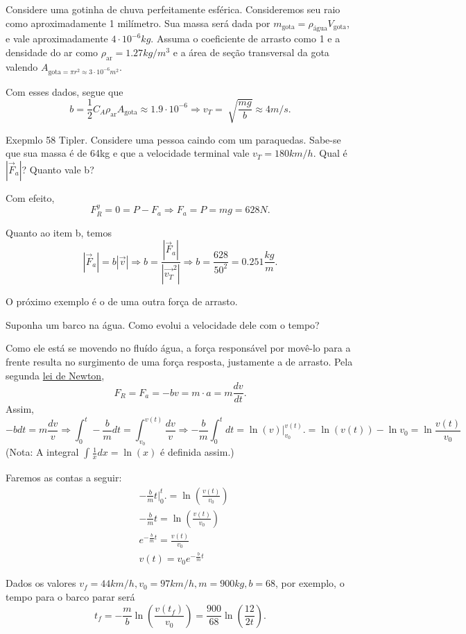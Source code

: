 \documentclass[PhysicsI/physics_notes.tex]{subfiles}
\begin{document}
\begin{example}
	Considere uma gotinha de chuva perfeitamente esférica. Consideremos seu raio como aproximadamente 1 milímetro.
	Sua massa será dada por \(m_{\text{gota}}=\rho_{\text{água}}V_{\text{gota}}\), e vale aproximadamente \(4 \cdot 10^{-6}kg\). Assuma o coeficiente de arrasto como
	1 e a densidade do ar como \(\rho_{\text{ar}}=1.27kg/m^3\) e a área de seção transversal da gota valendo \(A_{\text{gota}=\pi r^2\approx3 \cdot 10^{-6}m^2}\).

	Com esses dados, segue que
	\[
		b = \frac{1}{2}C_{A}\rho_{\text{ar}}A_{\text{gota}}\approx 1.9 \cdot 10^{-6} \Rightarrow v_{T} = \sqrt[]{\frac{mg}{b}}\approx 4m/s.
	\]
\end{example}
\begin{example}
	Exepmlo 58 Tipler. Considere uma pessoa caindo com um paraquedas. Sabe-se que sua massa é de 64kg e que a velocidade terminal vale \(v_{T}=180km/h\). Qual é
	\(|\vec{F}_{a}|\)? Quanto vale b?

	Com efeito,
	\[
		F_{R}^{y} = 0 = P-F_{a} \Rightarrow F_{a} = P = mg = 628N.
	\]

	Quanto ao item  b, temos
	\[
		|\vec{F}_{a}| = b |\vec{v}| \Rightarrow  b = \frac{|\vec{F}_{a}|}{|\vec{v_{T}}^2|} \Rightarrow b = \frac{628}{50^2} = 0.251 \frac{kg}{m}.
	\]
\end{example}
O próximo exemplo é o de uma outra força de arrasto.
\begin{example}
	Suponha um barco na água. Como evolui a velocidade dele com o tempo?

	Como ele está se movendo no fluído água, a força responsável por movê-lo para
	a frente resulta no surgimento de uma força resposta, justamente a de arrasto.
	Pela segunda \hyperlink{second_newton}{lei de Newton},
	\[
		F_{R} = F_{a} = -bv = m \cdot a = m \frac{dv}{dt}.
	\]
	Assim,
	\[
		-b dt = m \frac{dv}{v} \Rightarrow \int_{0}^{t}-\frac{b}{m}dt = \int_{v_{0}}^{v(t)}\frac{dv}{v}
		\Rightarrow -\frac{b}{m}\int_{0}^{t}dt = \ln{(v)}\biggl|_{v_{0}}^{v(t)}\biggr. = \ln{(v(t))} - \ln{v_{0}} = \ln{\frac{v(t)}{v_{0}}}
	\]
	(Nota: A integral \(\int_{}^{}\frac{1}{x}dx = \ln{(x)}\) é definida assim.)

	Faremos as contas a seguir:
	\begin{align*}
		 & -\frac{b}{m}t \biggl|_{0}^{t}\biggr. = \ln{(\frac{v(t)}{v_{0}})} \\
		 & -\frac{b}{m}t = \ln{(\frac{v(t)}{v_{0}})}                        \\
		 & e^{-\frac{b}{m}t} = \frac{v(t)}{v_{0}}                           \\
		 & v(t) = v_{0}e^{-\frac{b}{m}t}
	\end{align*}

	Dados os valores \(v_{f}=44km/h, v_{0} = 97km/h, m=900kg, b=68\), por exemplo,
	o tempo para o barco parar será
	\[
		t_{f} = -\frac{m}{b}\ln{(\frac{v(t_{f})}{v_{0}})} = \frac{900}{68}\ln{(\frac{12}{2t})}.
	\]
\end{example}
\end{document}
